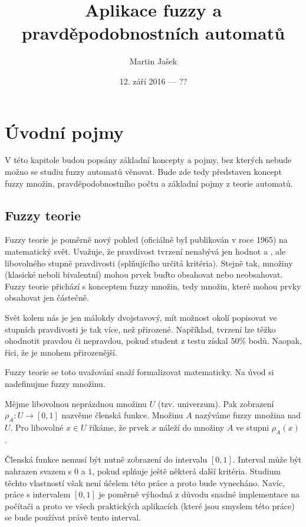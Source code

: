 \documentclass[a4paper,10pt]{article}
\title{Aplikace fuzzy a pravděpodobnostních automatů}
\author{Martin Jašek}
\date{12. září 2016 --- ??}
\begin{document}
\maketitle
\tableofcontents
\newpage

\section{Úvodní pojmy}
V této kapitole budou popsány základní koncepty a pojmy, bez kterých nebude možno se studiu fuzzy automatů věnovat. Bude zde tedy představen koncept fuzzy množin, pravděpodobnostního počtu a základní pojmy z teorie automatů.

\subsection{Fuzzy teorie}
Fuzzy teorie je poměrně nový pohled (oficiálně byl publikován v roce 1965) na matematický svět. Uvažuje, že pravdivost tvrzení nenabývá jen hodnot  a , ale libovolného stupně pravdivosti (splňujícího určitá kritéria). Stejně tak, množiny (klasické neboli bivalentní) mohou prvek buďto obsahovat nebo neobsahovat. Fuzzy teorie přichází s konceptem fuzzy množin, tedy množin, které mohou prvky obsahovat jen částečně.

Svět kolem nás je jen málokdy dvojstavový, mít možnost okolí popisovat ve stupních pravdivosti je tak více, než přirozené. Například, tvrzení  lze těžko ohodnotit pravdou či nepravdou, pokud student z testu získal $50\%$ bodů. Naopak, říci, že  je mnohem přirozenější. 

Fuzzy teorie se toto uvažování snaží formalizovat matematicky. Na úvod si nadefinujme fuzzy množinu. 
\begin{definition}
 Mějme libovolnou neprázdnou množinu $U$ (tzv. univerzum). Pak zobrazení $\rho_A: U \rightarrow [0, 1]$ nazvěme členská funkce. Množinu $A$ nazýváme fuzzy množina nad $U$. Pro libovolné $x \in U$ říkáme, že prvek $x$ náleží do množiny $A$ ve stupni $\rho_A(x)$.
\end{definition}

\begin{note}
 Členská funkce nemusí být nutně zobrazení do intervalu $[0, 1]$. Interval může být nahrazen svazem s $0$ a $1$, pokud splňuje ještě některá další kritéria. Studium těchto vlastností však není účelem této práce a proto bude vynecháno. Navíc, práce s intervalem $[0 ,1]$ je poměrně výhodná z důvodu snadné implementace na počítači a proto ve všech praktických aplikacích (které jsou smyslem této práce) se bude používat právě tento interval.
\end{note}
\end{document}
